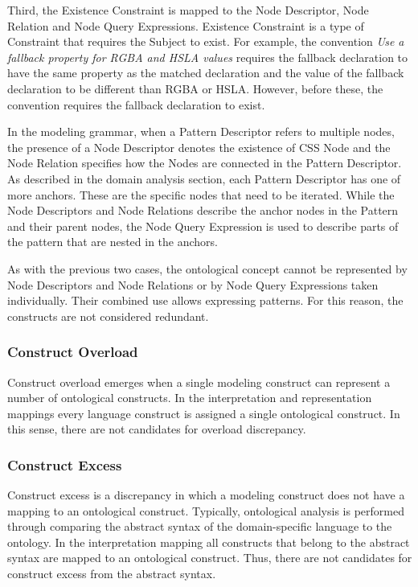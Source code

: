 \documentclass[parskip=full]{uvamscse}
\begin{document}
Third, the Existence Constraint is mapped to the Node Descriptor, Node Relation and Node Query
Expressions. Existence Constraint is a type of Constraint that requires the Subject to exist. For
example, the convention \textit{Use a fallback property for RGBA and HSLA values} requires the
fallback declaration to have the same property as the matched declaration and the value of the
fallback declaration to be different than RGBA or HSLA. However, before these, the convention
requires the fallback declaration to exist.

In the modeling grammar, when a Pattern Descriptor refers to multiple nodes, the presence of a Node
Descriptor denotes the existence of CSS Node and the Node Relation specifies how the Nodes are
connected in the Pattern Descriptor. As described in the domain analysis section, each Pattern
Descriptor has one of more anchors. These are the specific nodes that need to be iterated. While the
Node Descriptors and Node Relations describe the anchor nodes in the Pattern and their parent nodes,
the Node Query Expression is used to describe parts of the pattern that are nested in the anchors.

As with the previous two cases, the ontological concept cannot be represented by Node Descriptors
and Node Relations or by Node Query Expressions taken individually. Their combined use allows
expressing patterns. For this reason, the constructs are not considered redundant.


\subsubsection{Construct Overload}

Construct overload emerges when a single modeling construct can represent a number of ontological
constructs. In the interpretation and representation mappings every language construct is assigned a
single ontological construct. In this sense, there are not candidates for overload discrepancy.

\subsubsection{Construct Excess}

Construct excess is a discrepancy in which a modeling construct does not have a mapping to an
ontological construct. Typically, ontological analysis is performed through comparing the abstract
syntax of the domain-specific language to the ontology. In the interpretation mapping all constructs
that belong to the abstract syntax are mapped to an ontological construct. Thus, there are not
candidates for construct excess from the abstract syntax.
\end{document}
